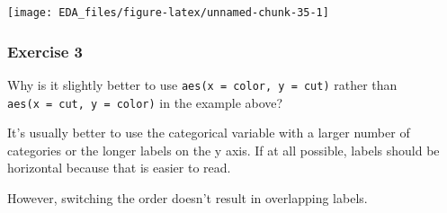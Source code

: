 \documentclass[]{book}
\newenvironment{Shaded}{\begin{snugshade}}{\end{snugshade}}
\newcommand{\DataTypeTok}[1]{\textcolor[rgb]{0.13,0.29,0.53}{#1}}
\newcommand{\DecValTok}[1]{\textcolor[rgb]{0.00,0.00,0.81}{#1}}
\newcommand{\KeywordTok}[1]{\textcolor[rgb]{0.13,0.29,0.53}{\textbf{#1}}}
\newcommand{\NormalTok}[1]{#1}
\newcommand{\OperatorTok}[1]{\textcolor[rgb]{0.81,0.36,0.00}{\textbf{#1}}}
\newcommand{\OtherTok}[1]{\textcolor[rgb]{0.56,0.35,0.01}{#1}}
\newcommand{\StringTok}[1]{\textcolor[rgb]{0.31,0.60,0.02}{#1}}
\theoremstyle{plain}
\theoremstyle{remark}
\theoremstyle{definition}
\theoremstyle{definition}
\theoremstyle{definition}
\theoremstyle{remark}
\begin{document}
\begin{Shaded}
\end{Shaded}

\begin{center}\texttt{[image: EDA\_files/figure-latex/unnamed-chunk-35-1]} \end{center}

\hypertarget{exercise-3-13}{%
\subsubsection{Exercise 3}\label{exercise-3-13}}

Why is it slightly better to use \texttt{aes(x\ =\ color,\ y\ =\ cut)}
rather than \texttt{aes(x\ =\ cut,\ y\ =\ color)} in the example above?

It's usually better to use the categorical variable with a larger number
of categories or the longer labels on the y axis. If at all possible,
labels should be horizontal because that is easier to read.

However, switching the order doesn't result in overlapping labels.
\end{document}
